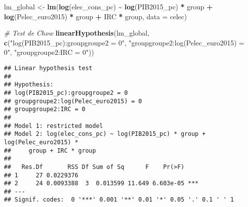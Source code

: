 \documentclass[
]{article}
\newenvironment{Shaded}{\begin{snugshade}}{\end{snugshade}}
\newcommand{\AttributeTok}[1]{\textcolor[rgb]{0.13,0.29,0.53}{#1}}
\newcommand{\CommentTok}[1]{\textcolor[rgb]{0.56,0.35,0.01}{\textit{#1}}}
\newcommand{\DecValTok}[1]{\textcolor[rgb]{0.00,0.00,0.81}{#1}}
\newcommand{\FunctionTok}[1]{\textcolor[rgb]{0.13,0.29,0.53}{\textbf{#1}}}
\newcommand{\NormalTok}[1]{#1}
\newcommand{\OtherTok}[1]{\textcolor[rgb]{0.56,0.35,0.01}{#1}}
\newcommand{\SpecialCharTok}[1]{\textcolor[rgb]{0.81,0.36,0.00}{\textbf{#1}}}
\newcommand{\StringTok}[1]{\textcolor[rgb]{0.31,0.60,0.02}{#1}}
\begin{document}
\begin{Shaded}
\end{Shaded}

\begin{Shaded}
\begin{Highlighting}[]
\NormalTok{lm\_global }\OtherTok{\textless{}{-}} \FunctionTok{lm}\NormalTok{(}\FunctionTok{log}\NormalTok{(elec\_cons\_pc) }\SpecialCharTok{\textasciitilde{}} \FunctionTok{log}\NormalTok{(PIB2015\_pc) }\SpecialCharTok{*}\NormalTok{ group }\SpecialCharTok{+}
                                  \FunctionTok{log}\NormalTok{(Pelec\_euro2015) }\SpecialCharTok{*}\NormalTok{ group }\SpecialCharTok{+}
\NormalTok{                                  IRC }\SpecialCharTok{*}\NormalTok{ group,}
                \AttributeTok{data =}\NormalTok{ celec)}
\end{Highlighting}
\end{Shaded}

\begin{Shaded}
\begin{Highlighting}[]
\CommentTok{\# Test de Chow}
\FunctionTok{linearHypothesis}\NormalTok{(lm\_global, }
                 \FunctionTok{c}\NormalTok{(}\StringTok{"log(PIB2015\_pc):groupgroupe2 = 0"}\NormalTok{,}
                   \StringTok{"groupgroupe2:log(Pelec\_euro2015) = 0"}\NormalTok{,}
                   \StringTok{"groupgroupe2:IRC = 0"}\NormalTok{))}
\end{Highlighting}
\end{Shaded}

\begin{verbatim}
## Linear hypothesis test
## 
## Hypothesis:
## log(PIB2015_pc):groupgroupe2 = 0
## groupgroupe2:log(Pelec_euro2015) = 0
## groupgroupe2:IRC = 0
## 
## Model 1: restricted model
## Model 2: log(elec_cons_pc) ~ log(PIB2015_pc) * group + log(Pelec_euro2015) * 
##     group + IRC * group
## 
##   Res.Df       RSS Df Sum of Sq      F    Pr(>F)    
## 1     27 0.0229376                                  
## 2     24 0.0093388  3  0.013599 11.649 6.603e-05 ***
## ---
## Signif. codes:  0 '***' 0.001 '**' 0.01 '*' 0.05 '.' 0.1 ' ' 1
\end{verbatim}
\end{document}
